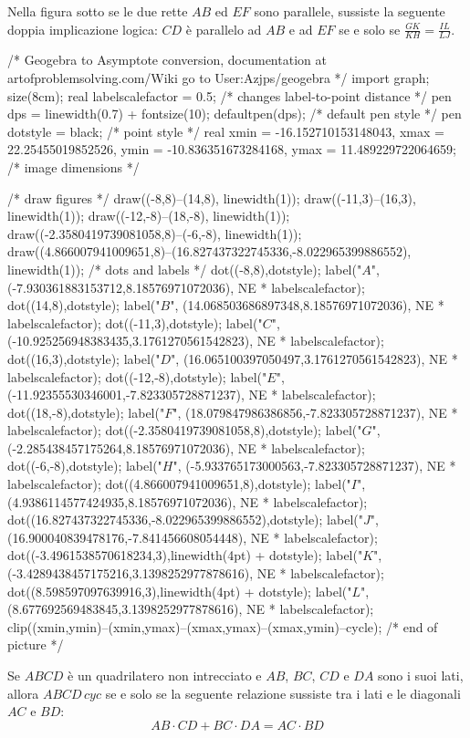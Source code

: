 \documentclass[11pt]{scrartcl}
\begin{document}
	\begin{theorem}[Talete]
		\label{talete}
		Nella figura sotto se le due rette $AB$ ed $EF$ sono parallele, sussiste la seguente doppia implicazione logica:
		$CD$ è parallelo ad $AB$ e ad $EF$ se e solo se $\frac{GK}{KH}=\frac{IL}{LJ}$.
		\begin{center}
			\begin{asy}
			/* Geogebra to Asymptote conversion, documentation at artofproblemsolving.com/Wiki go to User:Azjps/geogebra */
			import graph; size(8cm); 
			real labelscalefactor = 0.5; /* changes label-to-point distance */
			pen dps = linewidth(0.7) + fontsize(10); defaultpen(dps); /* default pen style */ 
			pen dotstyle = black; /* point style */ 
			real xmin = -16.152710153148043, xmax = 22.25455019852526, ymin = -10.836351673284168, ymax = 11.489229722064659;  /* image dimensions */
			
			/* draw figures */
			draw((-8,8)--(14,8), linewidth(1)); 
			draw((-11,3)--(16,3), linewidth(1)); 
			draw((-12,-8)--(18,-8), linewidth(1)); 
			draw((-2.3580419739081058,8)--(-6,-8), linewidth(1)); 
			draw((4.866007941009651,8)--(16.827437322745336,-8.022965399886552), linewidth(1)); 
			/* dots and labels */
			dot((-8,8),dotstyle); 
			label("$A$", (-7.930361883153712,8.18576971072036), NE * labelscalefactor); 
			dot((14,8),dotstyle); 
			label("$B$", (14.068503686897348,8.18576971072036), NE * labelscalefactor); 
			dot((-11,3),dotstyle); 
			label("$C$", (-10.925256948383435,3.1761270561542823), NE * labelscalefactor); 
			dot((16,3),dotstyle); 
			label("$D$", (16.065100397050497,3.1761270561542823), NE * labelscalefactor); 
			dot((-12,-8),dotstyle); 
			label("$E$", (-11.92355530346001,-7.823305728871237), NE * labelscalefactor); 
			dot((18,-8),dotstyle); 
			label("$F$", (18.079847986386856,-7.823305728871237), NE * labelscalefactor); 
			dot((-2.3580419739081058,8),dotstyle); 
			label("$G$", (-2.285438457175264,8.18576971072036), NE * labelscalefactor); 
			dot((-6,-8),dotstyle); 
			label("$H$", (-5.933765173000563,-7.823305728871237), NE * labelscalefactor); 
			dot((4.866007941009651,8),dotstyle); 
			label("$I$", (4.9386114577424935,8.18576971072036), NE * labelscalefactor); 
			dot((16.827437322745336,-8.022965399886552),dotstyle); 
			label("$J$", (16.900040839478176,-7.841456608054448), NE * labelscalefactor); 
			dot((-3.4961538570618234,3),linewidth(4pt) + dotstyle); 
			label("$K$", (-3.4289438457175216,3.1398252977878616), NE * labelscalefactor); 
			dot((8.598597097639916,3),linewidth(4pt) + dotstyle); 
			label("$L$", (8.677692569483845,3.1398252977878616), NE * labelscalefactor); 
			clip((xmin,ymin)--(xmin,ymax)--(xmax,ymax)--(xmax,ymin)--cycle); 
			/* end of picture */
			\end{asy}
		\end{center}
	\end{theorem}
	\begin{theorem}[Tolomeo]
		Se $ABCD$ è un quadrilatero non intrecciato e $AB$, $BC$, $CD$ e $DA$ sono i suoi lati, allora $ABCD \, cyc$ se e solo se la seguente relazione sussiste tra i lati e le diagonali $AC$ e $BD$:
		$$AB\cdot CD+ BC \cdot DA = AC \cdot BD$$ 
	\end{theorem}
	\newpage
\end{document}
